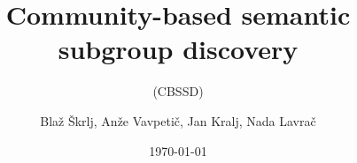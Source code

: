 \documentclass{beamer}
\begin{document}
\title{Community-based semantic subgroup discovery}
\subtitle{(CBSSD)}
\author{Bla\v{z} \v{S}krlj, An\v{z}e Vavpeti\v{c}, Jan Kralj, Nada Lavra\v{c}}
\date{\today} 


\begin{frame}

  {
    \titlepage
    
  }
  
\end{frame}
\end{document}
